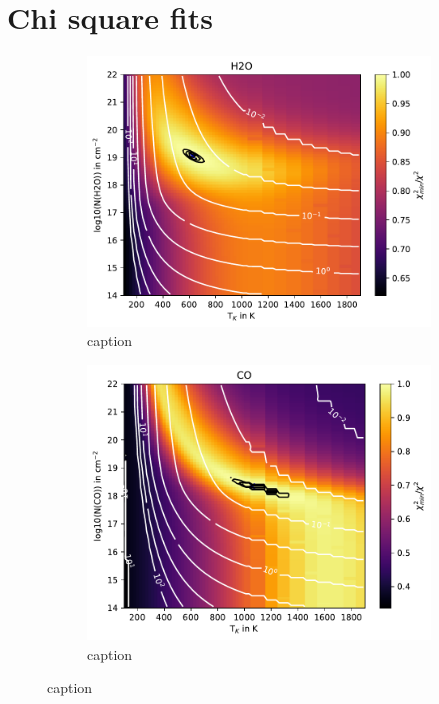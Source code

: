 \documentclass[twoside, single, authoryear, semicolon, 12pt]{lion-msc}
\newcommand{\4}{$_4$}
\newcommand{\3}{$_3$}
\newcommand{\2}{$_2$}
\begin{document}
\chapter{Chi square fits}
\begin{figure}[!ht]
    \centering
    \begin{subfigure}[b]{0.49\textwidth}
        \centering
        \includegraphics[width=\textwidth]{radexpy_niels/Radexpy_for_Niels/chi2_map_H2O_GWLup.pdf}
        \caption{caption}
    \end{subfigure}
    \hfill
    \begin{subfigure}[b]{0.49\textwidth}
        \centering
        \includegraphics[width=\textwidth]{radexpy_niels/Radexpy_for_Niels/chi2_map_CO_GWLup.pdf}
        \caption{caption}
    \end{subfigure}
    \caption{caption}
\end{figure}
\end{document}
